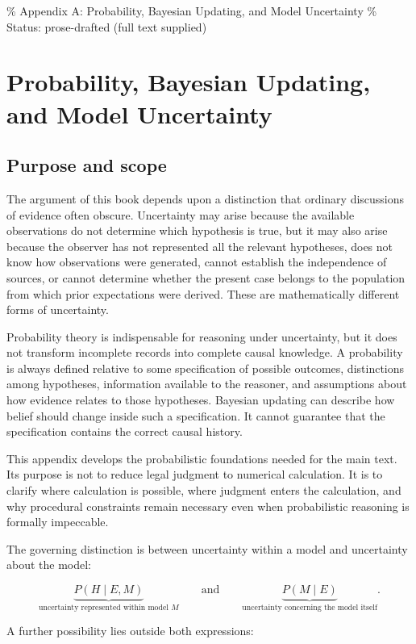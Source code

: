 \% Appendix A: Probability, Bayesian Updating, and Model Uncertainty
\% Status: prose-drafted (full text supplied)

\chapter{Probability, Bayesian Updating, and Model Uncertainty}
\label{app:a}

\section{Purpose and scope}
\label{sec:a1}

The argument of this book depends upon a distinction that ordinary discussions of evidence often obscure. Uncertainty may arise because the available observations do not determine which hypothesis is true, but it may also arise because the observer has not represented all the relevant hypotheses, does not know how observations were generated, cannot establish the independence of sources, or cannot determine whether the present case belongs to the population from which prior expectations were derived. These are mathematically different forms of uncertainty.

Probability theory is indispensable for reasoning under uncertainty, but it does not transform incomplete records into complete causal knowledge. A probability is always defined relative to some specification of possible outcomes, distinctions among hypotheses, information available to the reasoner, and assumptions about how evidence relates to those hypotheses. Bayesian updating can describe how belief should change inside such a specification. It cannot guarantee that the specification contains the correct causal history.

This appendix develops the probabilistic foundations needed for the main text. Its purpose is not to reduce legal judgment to numerical calculation. It is to clarify where calculation is possible, where judgment enters the calculation, and why procedural constraints remain necessary even when probabilistic reasoning is formally impeccable.

The governing distinction is between uncertainty within a model and uncertainty about the model:

\[
\underbrace{P(H\mid E,M)}_{\text{uncertainty represented within model }M}
\qquad\text{and}\qquad
\underbrace{P(M\mid E)}_{\text{uncertainty concerning the model itself}}.
\]

A further possibility lies outside both expressions:

